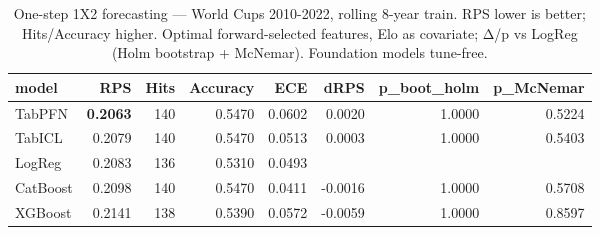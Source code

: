 \begin{table}[t]
  \centering
  \caption{One-step 1X2 forecasting — World Cups 2010-2022, rolling 8-year train. RPS lower is better; Hits/Accuracy higher. Optimal forward-selected features, Elo as covariate; Δ/p vs LogReg (Holm bootstrap + McNemar). Foundation models tune-free.}
  \label{tab:onestep_worldcup}
  \begin{tabular}{lrrrrrrr}
  \toprule
  model & RPS & Hits & Accuracy & ECE & dRPS & p\_boot\_holm & p\_McNemar \\
  \midrule
  TabPFN & \textbf{0.2063} & 140 & 0.5470 & 0.0602 & 0.0020 & 1.0000 & 0.5224 \\
  TabICL & 0.2079 & 140 & 0.5470 & 0.0513 & 0.0003 & 1.0000 & 0.5403 \\
  LogReg & 0.2083 & 136 & 0.5310 & 0.0493 &  &  &  \\
  CatBoost & 0.2098 & 140 & 0.5470 & 0.0411 & -0.0016 & 1.0000 & 0.5708 \\
  XGBoost & 0.2141 & 138 & 0.5390 & 0.0572 & -0.0059 & 1.0000 & 0.8597 \\
  \bottomrule
  \end{tabular}
\end{table}
